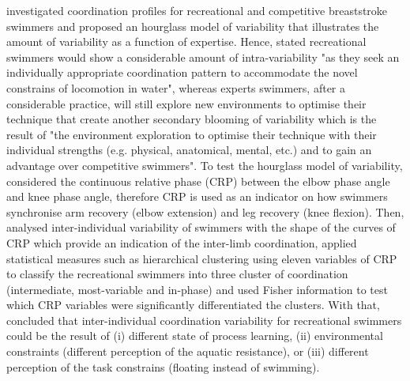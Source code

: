 \cite{seifert2011} investigated coordination profiles for recreational and 
competitive breaststroke swimmers and proposed an hourglass model of variability 
that illustrates the amount of variability as a function of expertise.
Hence, \citealt[p. 551]{seifert2011} stated 
recreational swimmers would show a considerable amount of intra-variability 
"as they seek an individually appropriate coordination pattern to accommodate
the novel constrains of locomotion in water", whereas experts swimmers, 
after a considerable practice,  
will still explore new environments to optimise their technique that 
create another secondary blooming of variability which is 
the result of "the environment exploration to optimise their technique 
with their individual strengths (e.g. physical, anatomical, mental, etc.)
and to gain an advantage over competitive swimmers".
To test the hourglass model of variability, 
\cite{seifert2011} considered the continuous relative phase (CRP) 
between the elbow phase angle and knee phase angle, therefore CRP 
is used as an indicator on how swimmers synchronise
arm recovery (elbow extension) and leg recovery (knee flexion).
Then, \cite{seifert2011} 
analysed inter-individual variability of swimmers with the shape of the curves 
of CRP which provide an indication of the inter-limb coordination, applied 
statistical measures such as hierarchical clustering using eleven variables of CRP 
to classify the recreational swimmers into three cluster of coordination 
(intermediate, most-variable and in-phase)
and used Fisher information to test which CRP variables were significantly 
differentiated the clusters. With that, \cite{seifert2011} concluded that 
inter-individual coordination variability for recreational swimmers could be 
the result of (i) different state of process learning, (ii) environmental 
constraints (different perception of the aquatic resistance), or (iii) 
different perception of the task constrains (floating instead of swimming).

